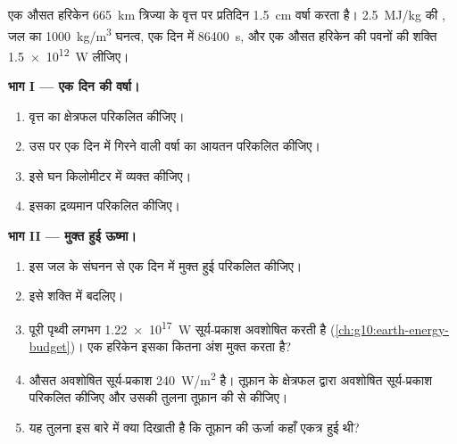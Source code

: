 \begin{problem}
\label{pb:g10:storms-and-cyclones:1}
एक औसत हरिकेन \qty{665}{km} त्रिज्या के वृत्त पर प्रतिदिन \qty{1.5}{cm} वर्षा
करता है। \qty{2.5}{MJ/kg} की , जल का
\qty{1000}{kg/m^3} घनत्व, एक दिन में \qty{86400}{s}, और एक औसत हरिकेन की
पवनों की शक्ति \qty{1.5e12}{W} लीजिए।

\medskip
\noindent\textbf{भाग I --- एक दिन की वर्षा।}
\begin{enumerate}
  \item वृत्त का क्षेत्रफल परिकलित कीजिए।
  \item उस पर एक दिन में गिरने वाली वर्षा का आयतन परिकलित कीजिए।
  \item इसे घन किलोमीटर में व्यक्त कीजिए।
  \item इसका द्रव्यमान परिकलित कीजिए।
\end{enumerate}

\medskip
\noindent\textbf{भाग II --- मुक्त हुई ऊष्मा।}
\begin{enumerate}[resume]
  \item इस जल के संघनन से एक दिन में मुक्त हुई  परिकलित
        कीजिए।
  \item इसे शक्ति में बदलिए।
  \item पूरी पृथ्वी लगभग \qty{1.22e17}{W} सूर्य-प्रकाश अवशोषित करती है
        (\cref{ch:g10:earth-energy-budget})। एक हरिकेन इसका कितना
        अंश मुक्त करता है?
  \item औसत अवशोषित सूर्य-प्रकाश \qty{240}{W/m^2} है। तूफ़ान के क्षेत्रफल द्वारा
        अवशोषित सूर्य-प्रकाश परिकलित कीजिए और उसकी तुलना
        तूफ़ान की  से कीजिए।
  \item यह तुलना इस बारे में क्या दिखाती है कि तूफ़ान की ऊर्जा कहाँ
        एकत्र हुई थी?
\end{enumerate}


\end{problem}
